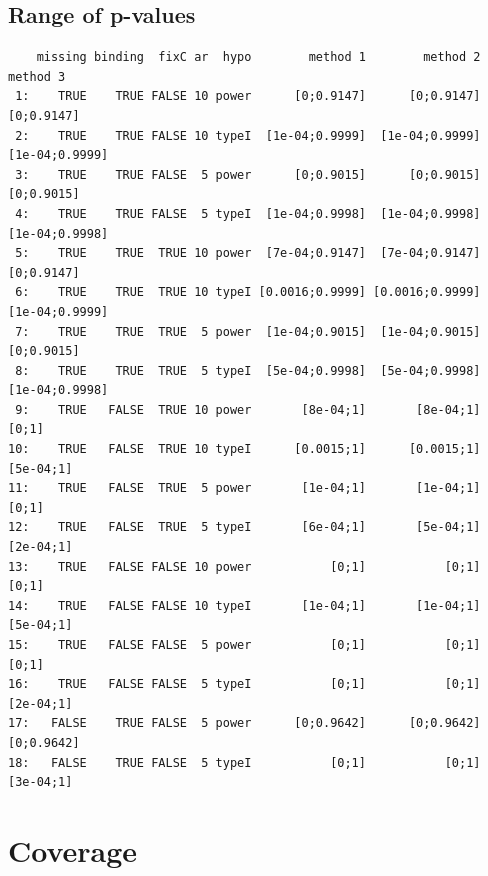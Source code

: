 \documentclass[12pt]{article}
\begin{document}
\subsection{Range of p-values}
\label{sec:org0db89f5}

\begin{verbatim}
    missing binding  fixC ar  hypo        method 1        method 2       method 3
 1:    TRUE    TRUE FALSE 10 power      [0;0.9147]      [0;0.9147]     [0;0.9147]
 2:    TRUE    TRUE FALSE 10 typeI  [1e-04;0.9999]  [1e-04;0.9999] [1e-04;0.9999]
 3:    TRUE    TRUE FALSE  5 power      [0;0.9015]      [0;0.9015]     [0;0.9015]
 4:    TRUE    TRUE FALSE  5 typeI  [1e-04;0.9998]  [1e-04;0.9998] [1e-04;0.9998]
 5:    TRUE    TRUE  TRUE 10 power  [7e-04;0.9147]  [7e-04;0.9147]     [0;0.9147]
 6:    TRUE    TRUE  TRUE 10 typeI [0.0016;0.9999] [0.0016;0.9999] [1e-04;0.9999]
 7:    TRUE    TRUE  TRUE  5 power  [1e-04;0.9015]  [1e-04;0.9015]     [0;0.9015]
 8:    TRUE    TRUE  TRUE  5 typeI  [5e-04;0.9998]  [5e-04;0.9998] [1e-04;0.9998]
 9:    TRUE   FALSE  TRUE 10 power       [8e-04;1]       [8e-04;1]          [0;1]
10:    TRUE   FALSE  TRUE 10 typeI      [0.0015;1]      [0.0015;1]      [5e-04;1]
11:    TRUE   FALSE  TRUE  5 power       [1e-04;1]       [1e-04;1]          [0;1]
12:    TRUE   FALSE  TRUE  5 typeI       [6e-04;1]       [5e-04;1]      [2e-04;1]
13:    TRUE   FALSE FALSE 10 power           [0;1]           [0;1]          [0;1]
14:    TRUE   FALSE FALSE 10 typeI       [1e-04;1]       [1e-04;1]      [5e-04;1]
15:    TRUE   FALSE FALSE  5 power           [0;1]           [0;1]          [0;1]
16:    TRUE   FALSE FALSE  5 typeI           [0;1]           [0;1]      [2e-04;1]
17:   FALSE    TRUE FALSE  5 power      [0;0.9642]      [0;0.9642]     [0;0.9642]
18:   FALSE    TRUE FALSE  5 typeI           [0;1]           [0;1]      [3e-04;1]
\end{verbatim}

\clearpage

\section{Coverage}
\label{sec:orgfefc181}
\end{document}
